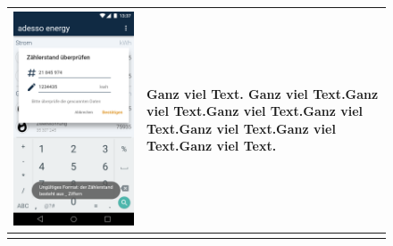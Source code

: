 \begin{figure}[h]
\begin{tabularx}{\textwidth}{X | X}
	\includegraphics[scale = 0.22]{img/AndroidMockup/illegalFormatException} & Ganz viel Text. Ganz viel Text.Ganz viel Text.Ganz viel Text.Ganz viel Text.Ganz viel Text.Ganz viel Text.Ganz viel Text. \\ \hline \\

\end{tabularx}
\end{figure}
